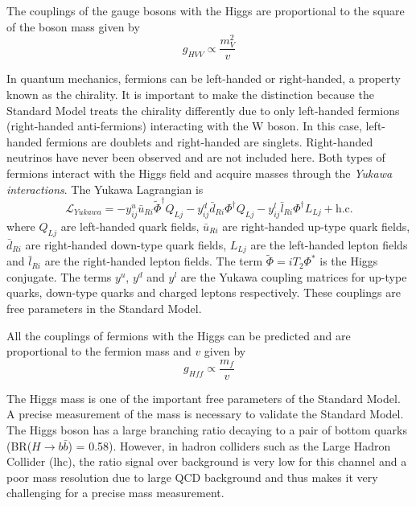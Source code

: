 The couplings of the gauge bosons with the Higgs are proportional to the square of the boson mass given by
\begin{equation}
  g_{HVV} \propto \frac{m_V^2}{v}
\end{equation}

In quantum mechanics, fermions can be left-handed or right-handed, a property known as the chirality. It is important to make the distinction because the Standard Model treats the chirality differently due to only left-handed fermions (right-handed anti-fermions) interacting with the W boson. In this case, left-handed fermions are doublets and right-handed are singlets. Right-handed neutrinos have never been observed and are not included here. Both types of fermions interact with the Higgs field and acquire masses through the \textit{Yukawa interactions}. The Yukawa Lagrangian is \cite{ILC_TDR_Vol2}
\begin{equation}
  \mathcal{L}_{Yukawa} = - y^u_{ij}\bar{u}_{Ri}\widetilde{\Phi}^{\dagger}Q_{Lj} - y^d_{ij}\bar{d}_{Ri}\Phi^{\dagger}Q_{Lj} - y^l_{ij}\bar{l}_{Ri}\Phi^{\dagger}L_{Lj} + \text{h.c}.
\end{equation}
where $Q_{Lj}$ are left-handed quark fields, $\bar{u}_{Ri}$ are right-handed up-type quark fields, $\bar{d}_{Ri}$ are right-handed down-type quark fields, $L_{Lj}$ are the left-handed lepton fields and $\bar{l}_{Ri}$ are the right-handed lepton fields. The term $\widetilde{\Phi} = iT_2\Phi^{*}$ is the Higgs conjugate. The terms $y^u$, $y^d$ and $y^l$ are the Yukawa coupling matrices for up-type quarks, down-type quarks and charged leptons respectively. These couplings are free parameters in the Standard Model.

All the couplings of fermions with the Higgs can be predicted and are proportional to the fermion mass and $v$ given by
\begin{equation}
  g_{Hff} \propto \frac{m_f}{v}
\end{equation}

The Higgs mass is one of the important free parameters of the Standard Model. A precise measurement of the mass is necessary to validate the Standard Model. The Higgs boson has a large branching ratio decaying to a pair of bottom quarks (BR($H \rightarrow b\bar{b}$) = 0.58). However, in hadron colliders such as the Large Hadron Collider (\acrshort{lhc}), the ratio signal over background is very low \cite{Aaboud:2017xsd} for this channel and a poor mass resolution due to large QCD background and thus makes it very challenging for a precise mass measurement.

